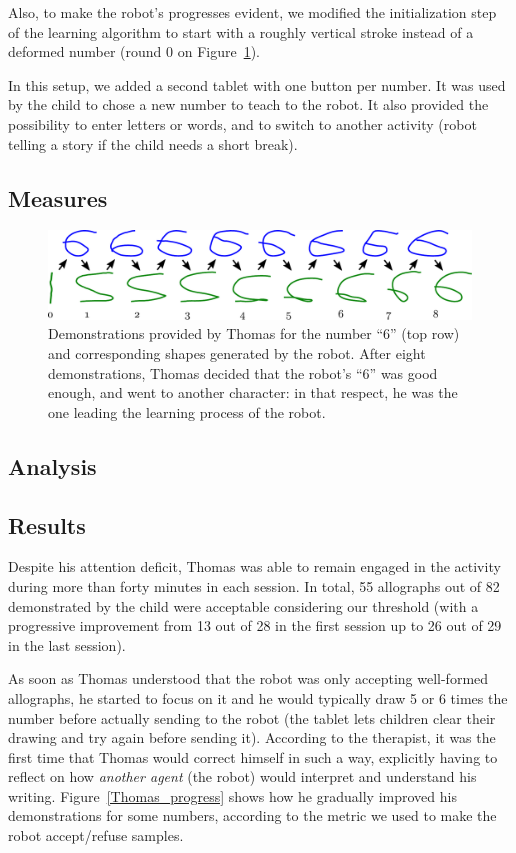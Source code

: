 \documentclass{sig-alternate}
\begin{document}
Also, to make
the robot's progresses evident, we modified the initialization step of the
learning algorithm to start with a roughly vertical stroke instead of a
deformed number (round 0 on Figure~\ref{learning_6_demos}).

In this setup, we added a second tablet with one button per number. It was used
by the child to chose a new number to teach to the robot. It also provided the
possibility to enter letters or words, and to switch to another activity (robot telling a story if the child needs a short break).

\subsection{Measures}

\begin{figure}
    \centering
    \includegraphics[width=0.9\linewidth]{learning_6_demos}
    \caption{\small Demonstrations provided by Thomas for the number ``6'' (top row) and
        corresponding shapes generated by the robot. After eight demonstrations,
        Thomas decided that the robot's ``6'' was good enough, and went to
    another character: in that respect, he was the one leading the learning
process of the robot.}
    \label{learning_6_demos}
\end{figure}

\subsection{Analysis}

\subsection{Results}
Despite his attention deficit, Thomas was able to remain engaged in the activity during more than
forty minutes in each session. In total, 55 allographs out of 82 
demonstrated by the child were acceptable considering our threshold (with a
progressive improvement from 13 out of 28 in the first session up to 26 out
of 29 in the last session).

As soon as Thomas understood that the robot was only accepting well-formed
allographs, he started to focus on it and he would typically draw 5 or 6 times
the number before actually sending to the robot (the tablet lets children
clear their drawing and try again before sending it). According to
the therapist, it was the first time that Thomas would correct himself in such a
way, explicitly having to reflect on how \emph{another agent} (the robot) would
interpret and understand his writing. Figure~\ref{Thomas_progress} shows how
he gradually improved his demonstrations for some numbers, according to the
metric we used to make the robot accept/refuse samples.
\end{document}
